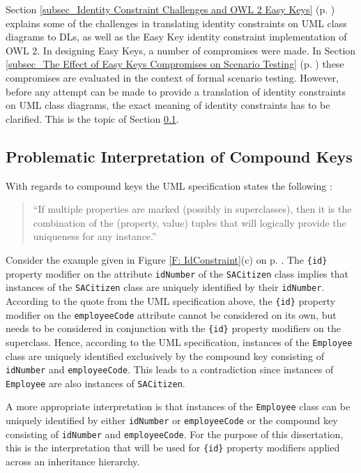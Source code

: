 Section \ref{subsec_Identity Constraint Challenges and OWL 2 Easy Keys} (p. \pageref{subsec_Identity Constraint Challenges and OWL 2 Easy Keys}) 
explains some of the challenges in translating identity constraints on UML class diagrams to DLs, as well as the Easy Key 
identity constraint implementation of OWL 2. In designing Easy Keys, a number of compromises were made. In Section 
\ref{subsec_The Effect of Easy Keys Compromises on Scenario Testing} (p. \pageref{subsec_The Effect of Easy Keys Compromises on Scenario Testing})
these compromises are evaluated in the context of formal scenario testing. However, before any attempt can be made to provide a translation of identity constraints on UML class diagrams,
the exact meaning of identity constraints has to be clarified. This is the topic of Section \ref{subsec_Problematic Interpretation of Compound Keys}.

\subsection{Problematic Interpretation of Compound Keys} \label{subsec_Problematic Interpretation of Compound Keys}
  With regards to compound keys the UML specification states the following \cite{ISO-UMLSuper2.4.1}:
  \begin{quote}
  ``If multiple properties are marked (possibly in superclasses), then it is the combination of the (property,
      value) tuples that will logically provide the uniqueness for any instance.''
  \end{quote}

  Consider the example given in Figure \ref{F: IdConstraint}(c) on p. \pageref{F: IdConstraint}. The \texttt{\{id\}} property modifier on the attribute \texttt{idNumber} of the \texttt{SACitizen} class
  implies that instances of the \texttt{SACitizen} class are uniquely identified by their \texttt{idNumber}. According to the quote from the UML specification above, the \texttt{\{id\}} property modifier
  on the \texttt{employeeCode} attribute cannot be considered on its own, but needs to be considered 
  in conjunction with the \texttt{\{id\}} property modifiers on the superclass. Hence, according to the 
  UML specification, instances of the \texttt{Employee} class are uniquely identified exclusively by the compound key consisting of \texttt{idNumber} and \texttt{employeeCode}. This leads to a contradiction 
  since instances of \texttt{Employee} are also instances of \texttt{SACitizen}.

   A more appropriate 
   interpretation is that instances of the \texttt{Employee} class can be uniquely identified by either \texttt{idNumber} or \texttt{employeeCode} or the compound key consisting of \texttt{idNumber} and 
   \texttt{employeeCode}. For the purpose of this dissertation, this is the interpretation that will be used for \texttt{\{id\}} property modifiers applied across an inheritance hierarchy.
   
